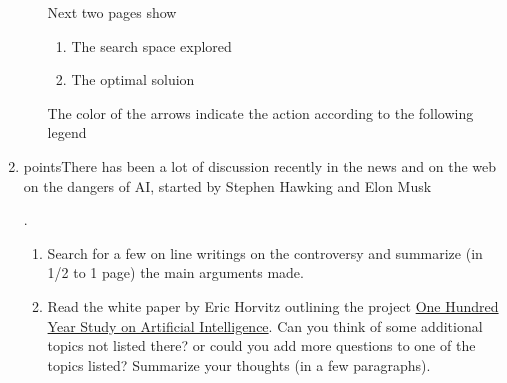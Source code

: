 \documentclass[11pt]{article}  %
\begin{document}
\begin{enumerate}
\begin{enumerate}
      Next two pages show 
        \begin{enumerate}
          \item The search space explored
          \item The optimal soluion
        \end{enumerate}
    The color of the arrows indicate the action according to the following
    legend
    \par{}
    
    
    \end{enumerate}
    \item {} points\rbrack There has been a lot of discussion recently
    in the news and on the web on the dangers of AI, started by Stephen Hawking and Elon
    Musk
    \par.
    \begin{enumerate}
    \item Search for a few on line writings on the controversy and summarize (in
    1/2 to 1 page) the main arguments made.
    \item Read the white paper by Eric Horvitz outlining the project
    \href{https://stanford.app.box.com/s/266hrhww2l3gjoy9euar}{One Hundred Year Study on Artificial Intelligence}.
    Can you think of some additional topics not listed there? or could you add more
    questions to one of the topics listed? Summarize your thoughts (in a few
    paragraphs).
    \par

\end{enumerate}
\end{enumerate}
\end{document}
